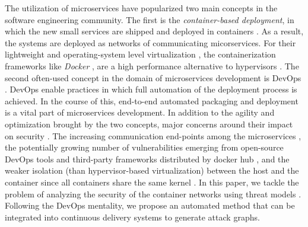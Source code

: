 The utilization of microservices have popularized two main concepts in the software engineering community. The first is the \textit{container-based deployment}, in which the new small services are shipped and deployed in containers \cite{bibid}. As a result, the systems are deployed as networks of communicating micorservices. For their lightweight and operating-system level virtualization \cite{what is the container hype}, the containerization frameworks like \textit{Docker} \cite{bibid}, are a high performance alternative to hypervisors \cite{nw}. The second often-used concept in the domain of microservices development is DevOps \cite{bibid}. DevOps enable practices in which full automation of the deployment process is achieved. In the course of this, end-to-end automated packaging and deployment  is a vital part of microservices development. In addition to the agility and optimization brought by the two concepts, major concerns around their impact on security \cite{ahmadvand2016requirements}. The increasing communication end-points among the microservices \cite{ahmadvand2016requirements}, the potentially growing number of vulnerabilities emerging from open-source DevOps tools and third-party frameworks distributed by docker hub \cite{shu2017study,gummaraju2015over}, and the weaker isolation (than hypervisor-based virtualization) between the host and the container since all containers share the same kernel \cite{Bottomley}. In this paper, we tackle the problem of analyzing the security of the container networks using threat models \cite{kordy2014dag}. Following the DevOps mentality, we propose an automated method that can be integrated into continuous delivery systems to generate attack graphs.



